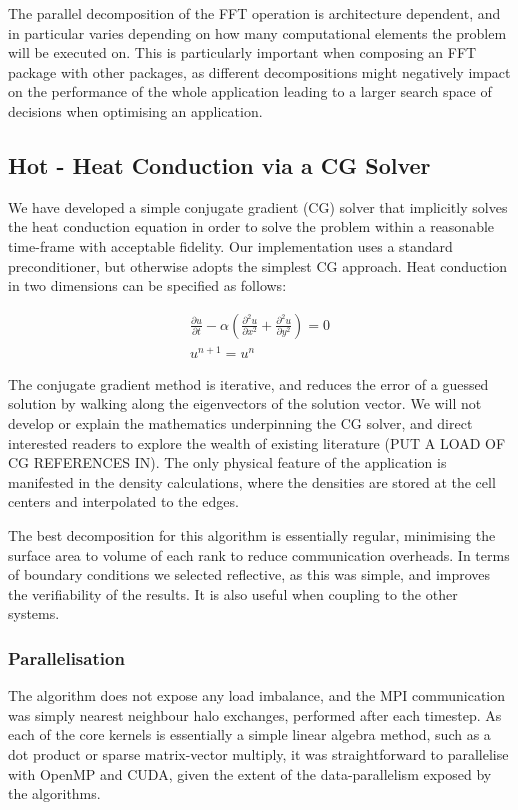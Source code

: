 \documentclass[runningheads,a4paper]{llncs}
\begin{document}
The parallel decomposition of the FFT operation is architecture dependent, and in particular varies depending on how many computational elements the problem will be executed on. This is particularly important when composing an FFT package with other packages, as different decompositions might negatively impact on the performance of the whole application leading to a larger search space of decisions when optimising an application.

\subsection{Hot - Heat Conduction via a CG Solver}

We have developed a simple conjugate gradient (CG) solver that implicitly solves the heat conduction equation in order to solve the problem within a reasonable time-frame with acceptable fidelity. Our implementation uses a standard preconditioner, but otherwise adopts the simplest CG approach. Heat conduction in two dimensions can be specified as follows:

\begin{align}
  \frac{\partial u}{\partial t} - \alpha (\frac{\partial^2u}{\partial x^2} + \frac{\partial^2u}{\partial y^2}) = 0 \\
  u^{n+1} = u^n
\end{align}

The conjugate gradient method is iterative, and reduces the error of a guessed solution by walking along the eigenvectors of the solution vector. We will not develop or explain the mathematics underpinning the CG solver, and direct interested readers to explore the wealth of existing literature \cite{} (PUT A LOAD OF CG REFERENCES IN). The only physical feature of the application is manifested in the density calculations, where the densities are stored at the cell centers and interpolated to the edges.

The best decomposition for this algorithm is essentially regular, minimising the surface area to volume of each rank to reduce communication overheads. In terms of boundary conditions we selected reflective, as this was simple, and improves the verifiability of the results. It is also useful when coupling to the other systems.

\subsubsection{Parallelisation}

The algorithm does not expose any load imbalance, and the MPI communication was simply nearest neighbour halo exchanges, performed after each timestep. As each of the core kernels is essentially a simple linear algebra method, such as a dot product or sparse matrix-vector multiply, it was straightforward to parallelise with OpenMP and CUDA, given the extent of the data-parallelism exposed by the algorithms.
\end{document}
